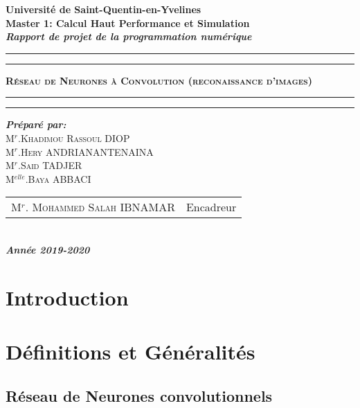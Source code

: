 \documentclass[a4paper,12pt]{report}
\begin{document}
\begin{center}
{\Large {\bf Université de Saint-Quentin-en-Yvelines}}\\
{\Large {\bf {Master 1: Calcul Haut Performance et Simulation }}}\\
 \textbf{{\Huge  \textit{Rapport de projet de la programmation numérique}}} \\
\hrule
\hrule
{}
{\Huge \textbf{\textsc{ Réseau de Neurones à Convolution (reconaissance d’images) }}}\\
\hrule
\hrule
{}
{\textbf{\textit {Préparé par:}}}\\
{\large\textsc{M$^{r}$.Khadimou Rassoul DIOP}}\\
{\large\textsc{M$^{r}$.Hery ANDRIANANTENAINA}}\\
{\large\textsc{M$^{r}$.Said TADJER }}\\
{\large\textsc{M$^{elle}$.Baya ABBACI}}\\
{\large
\begin{tabular}{ll}
M$^{r}$. \textsc{Mohammed Salah} IBNAMAR  & Encadreur    \\
\end{tabular}
}\\
{\Large\textbf{\textit{ Année 2019-2020}}}
\end{center}


\tableofcontents


\chapter*{Introduction}


\chapter{Définitions et Généralités}
\section{Réseau de Neurones convolutionnels}
\end{document}
